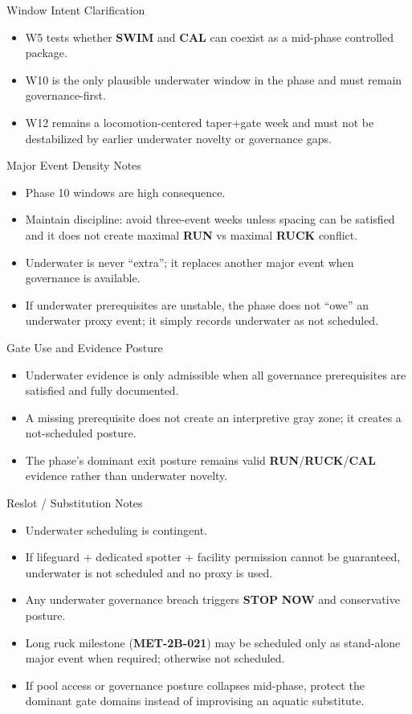 \documentclass[10pt]{article}
\begin{document}
Window Intent Clarification

\begin{itemize}
\item W5 tests whether \textbf{SWIM} and \textbf{CAL} can coexist as a mid-phase controlled package.
\item W10 is the only plausible underwater window in the phase and must remain governance-first.
\item W12 remains a locomotion-centered taper+gate week and must not be destabilized by earlier underwater novelty or governance gaps.
\end{itemize}

Major Event Density Notes

\begin{itemize}
\item Phase 10 windows are high consequence.
\item Maintain discipline: avoid three-event weeks unless spacing can be satisfied and it does not create maximal \textbf{RUN} vs maximal \textbf{RUCK} conflict.
\item Underwater is never “extra”; it replaces another major event when governance is available.
\item If underwater prerequisites are unstable, the phase does not “owe” an underwater proxy event; it simply records underwater as not scheduled.
\end{itemize}

Gate Use and Evidence Posture

\begin{itemize}
\item Underwater evidence is only admissible when all governance prerequisites are satisfied and fully documented.
\item A missing prerequisite does not create an interpretive gray zone; it creates a not-scheduled posture.
\item The phase’s dominant exit posture remains valid \textbf{RUN}/\textbf{RUCK}/\textbf{CAL} evidence rather than underwater novelty.
\end{itemize}

Reslot / Substitution Notes

\begin{itemize}
\item Underwater scheduling is contingent.
\item If lifeguard + dedicated spotter + facility permission cannot be guaranteed, underwater is not scheduled and no proxy is used.
\item Any underwater governance breach triggers \textbf{STOP} \textbf{NOW} and conservative posture.
\item Long ruck milestone (\textbf{MET-2B-021}) may be scheduled only as stand-alone major event when required; otherwise not scheduled.
\item If pool access or governance posture collapses mid-phase, protect the dominant gate domains instead of improvising an aquatic substitute.
\end{itemize}
\end{document}
